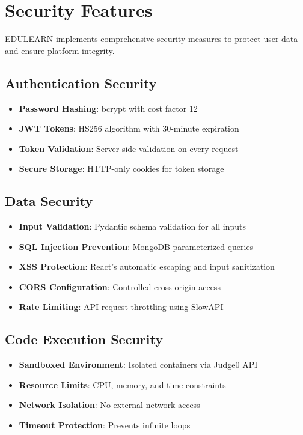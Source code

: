 \documentclass[conference]{IEEEtran}
\begin{document}
\section{Security Features}
EDULEARN implements comprehensive security measures to protect user data and ensure platform integrity.

\subsection{Authentication Security}
\begin{itemize}
    \item \textbf{Password Hashing}: bcrypt with cost factor 12
    \item \textbf{JWT Tokens}: HS256 algorithm with 30-minute expiration
    \item \textbf{Token Validation}: Server-side validation on every request
    \item \textbf{Secure Storage}: HTTP-only cookies for token storage
\end{itemize}

\subsection{Data Security}
\begin{itemize}
    \item \textbf{Input Validation}: Pydantic schema validation for all inputs
    \item \textbf{SQL Injection Prevention}: MongoDB parameterized queries
    \item \textbf{XSS Protection}: React's automatic escaping and input sanitization
    \item \textbf{CORS Configuration}: Controlled cross-origin access
    \item \textbf{Rate Limiting}: API request throttling using SlowAPI
\end{itemize}

\subsection{Code Execution Security}
\begin{itemize}
    \item \textbf{Sandboxed Environment}: Isolated containers via Judge0 API
    \item \textbf{Resource Limits}: CPU, memory, and time constraints
    \item \textbf{Network Isolation}: No external network access
    \item \textbf{Timeout Protection}: Prevents infinite loops
\end{itemize}
\end{document}
